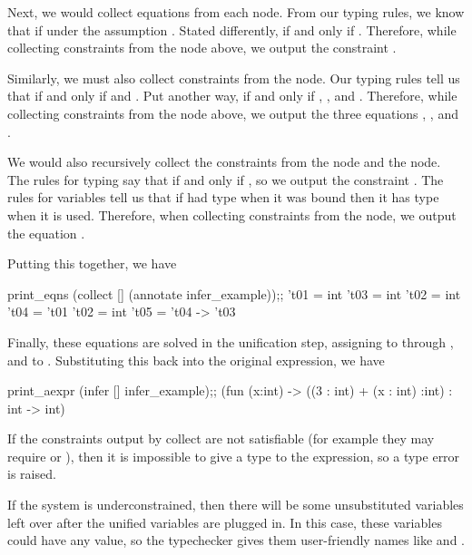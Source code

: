 \documentclass{pset}
\begin{document}
Next, we would collect equations from each node.  From our typing rules, we
know that  if  under the assumption
.  Stated differently,  if and only
if .  Therefore, while collecting constraints from the
 node above, we output the constraint .

Similarly, we must also collect constraints from the \code{+} node.  Our typing
rules tell us that  if and only if  and
.  Put another way,  if and only if
, , and .  Therefore, while
collecting constraints from the \code{+} node above, we output the three
equations , , and .

We would also recursively collect the constraints from the  node and
the  node.  The rules for typing  say that  if and
only if , so we output the constraint .  The
rules for variables tell us that if  had type  when it was
bound then it has type  when it is used.  Therefore, when collecting
constraints from the  node, we output the equation
.

Putting this together, we have
\begin{ocaml}
print_eqns (collect [] (annotate infer_example));;
      't01 = int              't03 = int
      't02 = int              't04 = 't01
      't02 = int              't05 = 't04 -> 't03
\end{ocaml}

Finally, these equations are solved in the unification step, assigning
 to  through , and  to
.  Substituting this back into the original expression, we have

\begin{ocaml}
print_aexpr (infer [] infer_example);;
  (fun (x:int) -> ((3 : int) + (x : int) :int) : int -> int)
\end{ocaml}

If the constraints output by collect are not satisfiable (for example they may
require  or ), then it is impossible to
give a type to the expression, so a type error is raised.

If the system is underconstrained, then there will be some unsubstituted
variables left over after the unified variables are plugged in.  In this case,
these variables could have any value, so the typechecker gives them
user-friendly names like  and .
\end{document}
